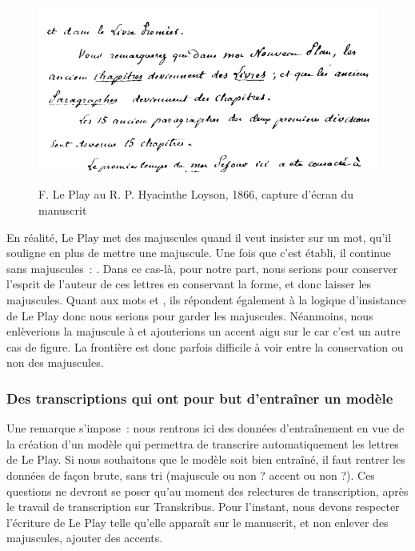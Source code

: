 \begin{figure}[ht]
    \centering
    \caption{F. Le Play au R. P. Hyacinthe Loyson, 1866, capture d'écran du manuscrit}
    \includegraphics[width=16cm]{images/majusculesTranskribus.png}
    \label{majusculesTranskribus}
\end{figure}

En réalité, Le Play met des majuscules quand il veut insister sur un mot, qu'il souligne en plus de mettre une majuscule. Une fois que c’est établi, il continue sans majuscules :
. Dans ce cas-là, pour notre part, nous serions pour conserver l'esprit de l'auteur de ces lettres en conservant la forme, et donc laisser les majuscules. Quant aux mots  et , ils répondent également à la logique d'insistance de Le Play donc nous serions pour garder les majuscules. Néanmoins, nous enlèverions la majuscule à  et ajouterions un accent aigu sur le  car c'est un autre cas de figure. La frontière est donc parfois difficile à voir entre la conservation ou non des majuscules.\\

\subsubsection{Des transcriptions qui ont pour but d'entraîner un modèle}

Une remarque s'impose~: nous rentrons ici des données d'entraînement en vue de la création d'un modèle qui permettra de transcrire automatiquement les lettres de Le Play. Si nous souhaitons que le modèle soit bien entraîné, il faut rentrer les données de façon brute, sans tri (majuscule ou non ? accent ou non ?). Ces questions ne devront se poser qu'au moment des relectures de transcription, après le travail de transcription sur Transkribus. Pour l'instant, nous devons respecter l'écriture de Le Play telle qu'elle apparaît sur le manuscrit, et non enlever des majuscules, ajouter des accents.\\


